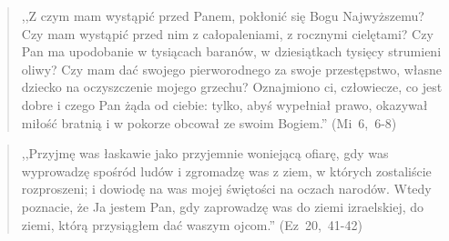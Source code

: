 \documentclass[10pt,a4paper,oneside]{article}
\begin{document}
\begin{quote}
,,Z czym mam wystąpić przed Panem, pokłonić się Bogu Najwyższemu? Czy mam wystąpić przed nim z całopaleniami, z rocznymi cielętami? Czy Pan ma upodobanie w tysiącach baranów, w dziesiątkach tysięcy strumieni oliwy? Czy mam dać swojego pierworodnego za swoje przestępstwo, własne dziecko na oczyszczenie mojego grzechu? Oznajmiono ci, człowiecze, co jest dobre i czego Pan żąda od ciebie: tylko, abyś wypełniał prawo, okazywał miłość bratnią i w pokorze obcował ze swoim Bogiem.'' \mbox{(Mi 6, 6-8)}
\end{quote}
\begin{quote}
,,Przyjmę was łaskawie jako przyjemnie woniejącą ofiarę, gdy was wyprowadzę spośród ludów i zgromadzę was z ziem, w których zostaliście rozproszeni; i dowiodę na was mojej świętości na oczach narodów. Wtedy poznacie, że Ja jestem Pan, gdy zaprowadzę was do ziemi izraelskiej, do ziemi, którą przysiągłem dać waszym ojcom.'' \mbox{(Ez 20, 41-42)}
\end{quote}
\end{document}
